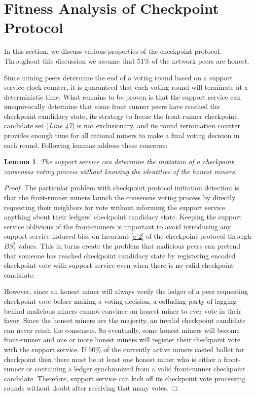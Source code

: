 \documentclass[conference]{IEEEtran}
\newtheorem{lemma}[theorem]{Lemma}
\begin{document}


    



    
        
\section{Fitness Analysis of Checkpoint Protocol}
\label{s-analysis}
In this section, we discuss various properties of the checkpoint protocol. Throughout this discussion we assume that $51\%$ of the network peers are honest.

Since mining peers determine the end of a voting round based on a support service clock counter, it is guaranteed that each voting round will terminate at a deterministic time. What remains to be proven is that the support service can unequivocally determine that some front runner peers have reached the checkpoint candidacy state, its strategy to freeze the front-runner checkpoint candidate set (\textit{Line 47}) is not exclusionary, and its round termination counter provides enough time for all rational miners to make a final voting decision in each round. Following lemmas address these concerns:     

\begin{lemma}
\label{l-proto-init}
The support service can determine the initiation of a checkpoint consensus voting process without knowing the identities of the honest miners.  
\end{lemma}
\begin{proof}
The particular problem with checkpoint protocol initiation detection is that the front-runner miners launch the consensus voting process by directly requesting their neighbors for vote without informing the support service anything about their ledgers' checkpoint candidacy state. Keeping the support service oblivious of the front-runners is important to avoid introducing any support service induced bias on Invariant \ref{e-2} of the checkpoint protocol through $BS_i^t$ values. This in turns create the problem that malicious peers can pretend that someone has reached checkpoint candidacy state by registering encoded checkpoint vote with support service even when there is no valid checkpoint candidate.

However, since an honest miner will always verify the ledger of a peer requesting checkpoint vote before making a voting decision, a colluding party of lagging-behind malicious miners cannot convince an honest miner to ever vote in their favor. Since the honest miners are the majority, an invalid checkpoint candidate can never reach the consensus. So eventually, some honest miners will become front-runner and one or more honest miners will register their checkpoint vote with the support service. If $50\%$ of the currently active miners casted ballot for checkpoint then there must be at least one honest miner who is either a front-runner or containing a ledger synchronized from a valid front-runner checkpoint candidate. Therefore, support service can kick off its checkpoint vote processing rounds without doubt after receiving that many votes. 
\end{proof}
\end{document}

